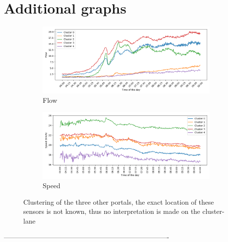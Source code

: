 	\section{Additional graphs}
	\begin{figure}[H]
		\centering
		\begin{subfigure}{0.9 \linewidth}
			\includegraphics[width=\textwidth]{../Plots/Flow/clustering_3portals}
			\caption{Flow}
		\end{subfigure}
		\begin{subfigure}{0.9 \linewidth}
			\includegraphics[width=\textwidth]{../Plots/Speed/clustering_3portals}
			\caption{Speed}
		\end{subfigure}
		\caption{Clustering of the three other portals, the exact location of these sensors is not known, thus no interpretation is made on the cluster-lane }
		\label{fig:clustering_3portals}
	\end{figure}
	-------------------------------------------------------------------------%
	
	\newpage
	
	
